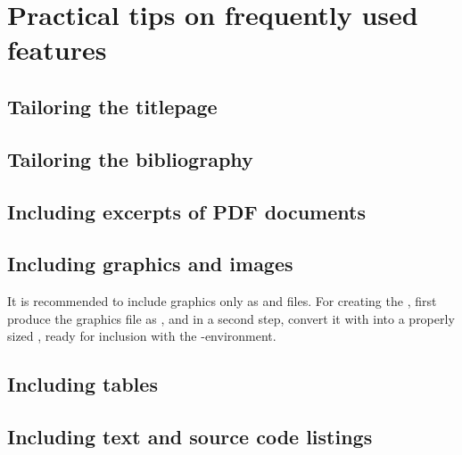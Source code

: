 

\section[Practical tips]{Practical tips on frequently used features}
\label{sec:practicalTips}


\subsection[Tailoring the titlepage]{Tailoring the titlepage}

\todo


\subsection[Tailoring the bibliography]{Tailoring the bibliography}

\todo


\subsection[Including excerpts of PDF documents]{Including excerpts of PDF documents}

\todo  %


\subsection[Graphics]{Including graphics and images}
\label{subsec:includingGraphicsImages}

It is recommended to include graphics only as  and 
files.  For creating the , first produce the graphics file as
, and in a second step, convert it with  into a
properly sized , ready for inclusion with the
-environment.


\subsection[Tables]{Including tables}

\todo


\subsection[Text and source code listings]{Including text and source code listings}

\todo


